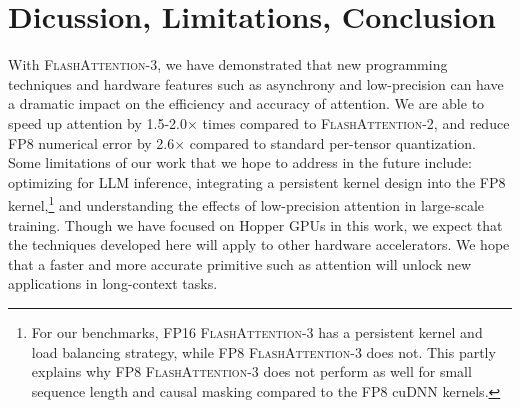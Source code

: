 \documentclass{article}
\newcommand{\fa}{\textsc{FlashAttention}\xspace}
\newcommand{\faa}{\textsc{FlashAttention-2}\xspace}
\newcommand{\fat}{\textsc{FlashAttention-3}\xspace}  %
\begin{document}
\section{Dicussion, Limitations, Conclusion}
\label{sec:discussion}

With \fat, we have demonstrated that new programming techniques and hardware
features such as asynchrony and low-precision can have a dramatic impact on the
efficiency and accuracy of attention.
We are able to speed up attention by 1.5-2.0$\times$ times compared to \faa, and
reduce FP8 numerical error by 2.6$\times$ compared to standard per-tensor quantization.
Some limitations of our work that we hope to address in the future include: optimizing for
LLM inference, integrating a persistent kernel design into the FP8 kernel,\footnote{For our benchmarks, FP16 \fat has a persistent kernel and load balancing strategy, while FP8 \fat does not. This partly explains why FP8 \fat does not perform as well for small sequence length and causal masking compared to the FP8 cuDNN kernels.} and understanding the effects of low-precision attention in
large-scale training.
Though we have focused on Hopper GPUs in this work, we expect that the
techniques developed here will apply to other hardware accelerators.
We hope that a faster and more accurate primitive such as attention will unlock
new applications in long-context tasks.


\iftoggle{arxiv}{
\subsubsection*{Acknowledgments}

We are grateful to the NVIDIA CUTLASS team (especially Haicheng Wu, Aniket
Shivam, and Cris Cecka) for helping us understand Hopper's
programming model and for their library, which provides clean and powerful building blocks for the implementation of \fat.
We thank the cuDNN team for the idea of in-kernel transpose for FP8.
The idea of overlapping GEMMs and softmax was inspired by insightful
conversations with Christopher R{\'e}, Benjamin Spector, Aniket Shivam, and Markus Hoehnerbach.
The pingpong scheduling is adapted from the warp-specialized pingpong GEMM
implementation in CUTLASS.
We appreciate Driss Guessous for integrating \fa to PyTorch.
\fat has benefited from helpful discussions with Horace He on different attention
variants, with Hao Liu and Phil Wang on distributed attention, and with Daniel
Haziza and Chris De Sa on quantization.
We thank Meta, Together AI, and Princeton Language and Intelligence (PLI) for compute support.

}{}
\end{document}
